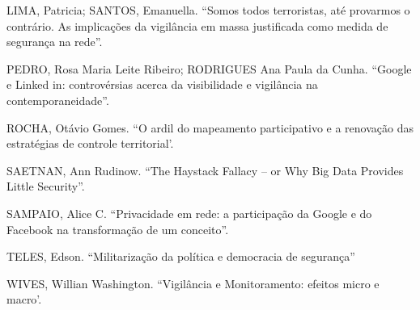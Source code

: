 LIMA, Patricia; SANTOS, Emanuella. ``Somos todos terroristas, até
provarmos o contrário. As implicações da vigilância em massa justificada
como medida de segurança na rede''.

PEDRO, Rosa Maria Leite Ribeiro; RODRIGUES Ana Paula da Cunha. ``Google
e Linked in: controvérsias acerca da visibilidade e vigilância na
contemporaneidade''.

ROCHA, Otávio Gomes. ``O ardil do mapeamento participativo e a renovação
das estratégias de controle territorial'.

SAETNAN, Ann Rudinow. ``The Haystack Fallacy -- or Why Big Data Provides
Little Security''.

SAMPAIO, Alice C. ``Privacidade em rede: a participação da Google e do
Facebook na transformação de um conceito''.

TELES, Edson. ``Militarização da política e democracia de segurança''

WIVES, Willian Washington. ``Vigilância e Monitoramento: efeitos micro e
macro'.
